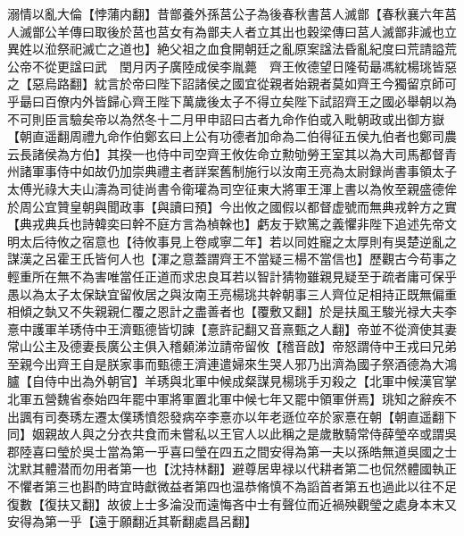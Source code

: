 溺情以亂大倫【悖蒲内翻】昔鄫養外孫莒公子為後春秋書莒人滅鄫【春秋襄六年莒人滅鄫公羊傳曰取後於莒也莒女有為鄫夫人者立其出也穀梁傳曰莒人滅鄫非滅也立異姓以涖祭祀滅亡之道也】絶父祖之血食開朝廷之亂原案諡法昏亂紀度曰荒請謚荒公帝不從更諡曰武　閏月丙子廣陸成侯李胤薨　齊王攸德望日隆荀朂馮紞楊珧皆惡之【惡烏路翻】紞言於帝曰陛下詔諸侯之國宜從親者始親者莫如齊王今獨留京師可乎朂曰百僚内外皆歸心齊王陛下萬歲後太子不得立矣陛下試詔齊王之國必舉朝以為不可則臣言驗矣帝以為然冬十二月甲申詔曰古者九命作伯或入毗朝政或出御方嶽【朝直遥翻周禮九命作伯鄭玄曰上公有功德者加命為二伯得征五侯九伯者也鄭司農云長諸侯為方伯】其揆一也侍中司空齊王攸佐命立勲劬勞王室其以為大司馬都督青州諸軍事侍中如故仍加崇典禮主者詳案舊制施行以汝南王亮為太尉録尚書事領太子太傅光祿大夫山濤為司徒尚書令衛瓘為司空征東大將軍王渾上書以為攸至親盛德侔於周公宜贊皇朝與聞政事【與讀曰預】今出攸之國假以都督虚號而無典戎幹方之實【典戎典兵也詩韓奕曰幹不庭方言為楨榦也】虧友于欵篤之義懼非陛下追述先帝文明太后待攸之宿意也【待攸事見上卷咸寧二年】若以同姓寵之太厚則有吳楚逆亂之謀漢之呂霍王氏皆何人也【渾之意蓋謂齊王不當疑三楊不當信也】歷觀古今苟事之輕重所在無不為害唯當任正道而求忠良耳若以智計猜物雖親見疑至于疏者庸可保乎愚以為太子太保缺宜留攸居之與汝南王亮楊珧共幹朝事三人齊位足相持正既無偏重相傾之埶又不失親親仁覆之恩計之盡善者也【覆敷又翻】於是扶風王駿光禄大夫李憙中護軍羊琇侍中王濟甄德皆切諫【憙許記翻又音熹甄之人翻】帝並不從濟使其妻常山公主及德妻長廣公主俱入稽顙涕泣請帝留攸【稽音啟】帝怒謂侍中王戎曰兄弟至親今出齊王自是朕家事而甄德王濟連遣婦來生哭人邪乃出濟為國子祭酒德為大鴻臚【自侍中出為外朝官】羊琇與北軍中候成粲謀見楊珧手刃殺之【北軍中候漢官掌北軍五營魏省泰始四年罷中軍將軍置北軍中候七年又罷中領軍併焉】珧知之辭疾不出諷有司奏琇左遷太僕琇憤怨發病卒李憙亦以年老遜位卒於家憙在朝【朝直遥翻下同】姻親故人與之分衣共食而未嘗私以王官人以此稱之是歲散騎常侍薛瑩卒或謂吳郡陸喜曰瑩於吳士當為第一乎喜曰瑩在四五之間安得為第一夫以孫皓無道吳國之士沈默其體潜而勿用者第一也【沈持林翻】避尊居卑禄以代耕者第二也侃然體國執正不懼者第三也斟酌時宜時獻微益者第四也温恭脩慎不為謟首者第五也過此以往不足復數【復扶又翻】故彼上士多淪没而遠悔吝中士有聲位而近禍殃觀瑩之處身本末又安得為第一乎【遠于願翻近其靳翻處昌呂翻】

